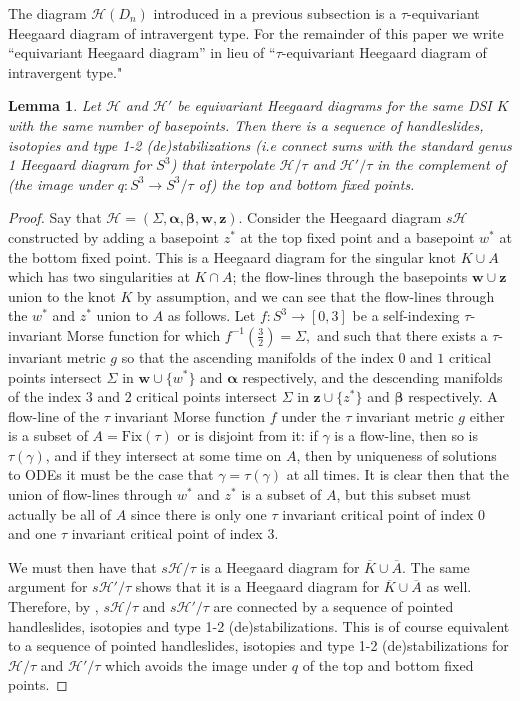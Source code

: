 \documentclass[11pt]{amsart}
\newtheorem{lemma}[theorem]{Lemma}
\theoremstyle{definition}
\theoremstyle{remark}
\numberwithin{equation}{section}
\begin{document}
The diagram $\mathcal{H}(D_n)$ introduced in a previous subsection is a $\tau$-equivariant Heegaard diagram of intravergent type. For the remainder of this paper we write ``equivariant Heegaard diagram'' in lieu of ``$\tau$-equivariant Heegaard diagram of intravergent type."
\begin{lemma}\label{eqhamiso}
Let $\mathcal{H}$ and $\mathcal{H}'$ be equivariant Heegaard diagrams for the same DSI $K$ with the same number of basepoints. Then there is a sequence of handleslides, isotopies and type 1-2 (de)stabilizations (i.e connect sums with the standard genus 1 Heegaard diagram for $S^3$) that interpolate $\mathcal{H}/\tau$ and $\mathcal{H}'/\tau$ in the complement of (the image under $q\colon S^3\to S^3/\tau$ of) the top and bottom fixed points. 
\end{lemma}
\begin{proof}
Say that $\mathcal{H}=(\Sigma,\bm{\alpha},\bm{\beta},\bm{w},\bm{z})$. Consider the Heegaard diagram $s\mathcal{H}$ constructed by adding a basepoint $z^*$ at the top fixed point and a basepoint $w^*$ at the bottom fixed point. This is a Heegaard diagram for the singular knot $K\cup A$ which has two singularities at $K\cap A$; the flow-lines through the basepoints $\bm{w}\cup\bm{z}$ union to the knot $K$ by assumption, and we can see that the flow-lines through the $w^*$ and $z^*$ union to $A$ as follows. Let $f\colon S^3\to[0,3]$ be a self-indexing $\tau$-invariant Morse function for which $f^{-1}(\frac{3}{2})=\Sigma,$ and such that there exists a $\tau$-invariant metric $g$ so that the ascending manifolds of the index $0$ and $1$ critical points intersect $\Sigma$ in $\bm{w}\cup\{w^*\}$ and $\bm{\alpha}$ respectively, and the descending manifolds of the index $3$ and $2$ critical points intersect $\Sigma$ in $\bm{z}\cup\{z^*\}$ and $\bm{\beta}$ respectively.  A flow-line of the $\tau$ invariant Morse function $f$ under the $\tau$ invariant metric $g$ either is a subset of $A=\textrm{Fix}(\tau)$ or is disjoint from it: if $\gamma $ is a flow-line, then so is $\tau(\gamma)$, and if they intersect at some time on $A$, then by uniqueness of solutions to ODEs it must be the case that $\gamma=\tau(\gamma)$ at all times. It is clear then that the union of flow-lines through $w^*$ and $z^*$ is a subset of $A$, but this subset must actually be all of $A$ since there is only one $\tau$ invariant critical point of index $0$ and one $\tau$ invariant critical point of index $3$. 

We must then have that $s\mathcal{H}/\tau$ is a Heegaard diagram for $\overline{K}\cup \overline{A}$. The same argument for $s\mathcal{H}'/\tau$ shows that it is a Heegaard diagram for $\overline{K}\cup \overline{A}$ as well. Therefore, by \cite[~Proof of Theorem 2.4]{OSsing1}, $s\mathcal{H}/\tau$ and $s\mathcal{H}'/\tau$ are connected by a sequence of pointed handleslides, isotopies and type 1-2 (de)stabilizations. This is of course equivalent to a sequence of pointed handleslides, isotopies and type 1-2 (de)stabilizations for $\mathcal{H}/\tau$ and $\mathcal{H}'/\tau$ which avoids the image under $q$ of the top and bottom fixed points.
\end{proof}
\end{document}
